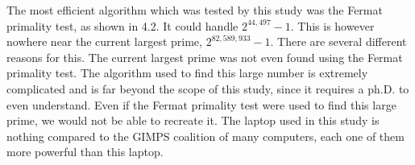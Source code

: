 \documentclass[main.tex]{subfiles}
\begin{document}
The most efficient algorithm which was tested by this study was the Fermat
primality test, as shown in 4.2. It could handle $2^{44,497}-1$. This is however
nowhere near the current largest prime, $2^{82,589,933}-1$. There are several
different reasons for this. The current largest prime was not even found using
the Fermat primality test. The algorithm used to find this large number is
extremely complicated and is far beyond the scope of this study, since it
requires a ph.D. to even understand. Even if the Fermat primality test were used
to find this large prime, we would not be able to recreate it. The laptop used
in this study is nothing compared to the GIMPS coalition of many computers, each
one of them more powerful than this laptop. \\
\end{document}
